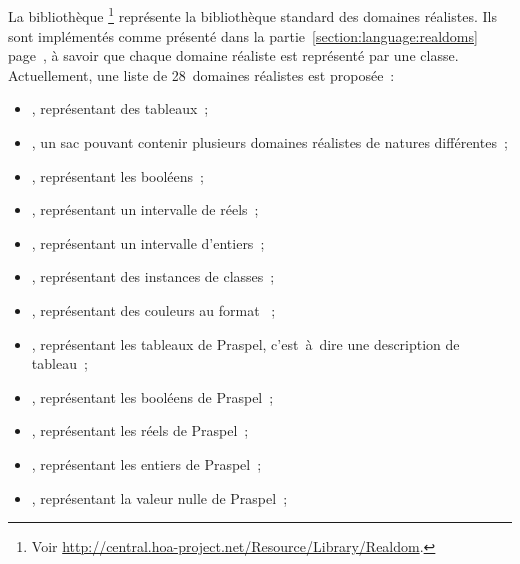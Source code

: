 \subsection{}
\label{subsection:tools:hoa-realdom}

La bibliothèque \footnote{Voir
\url{http://central.hoa-project.net/Resource/Library/Realdom}.} représente la
bibliothèque standard des domaines réalistes. Ils sont implémentés comme
présenté dans la partie~\ref{section:language:realdoms}
page~\pageref{section:language:realdoms}, à savoir que chaque domaine réaliste
est représenté par une classe.  Actuellement, une liste de 28~domaines réalistes
est proposée~:
%
\begin{itemize}

\item {}, représentant des tableaux~;

\item {}, un sac pouvant contenir plusieurs domaines réalistes de
natures différentes~;

\item {}, représentant les booléens~;

\item {}, représentant un intervalle de réels~;

\item {}, représentant un intervalle d'entiers~;

\item {}, représentant des instances de classes~;

\item {}, représentant des couleurs au format ~;

\item {}, représentant les tableaux de Praspel, c'est~à~dire une
description de tableau~;

\item {}, représentant les booléens de Praspel~;

\item {}, représentant les réels de Praspel~;

\item {}, représentant les entiers de Praspel~;

\item {}, représentant la valeur nulle de Praspel~;


\end{itemize}
